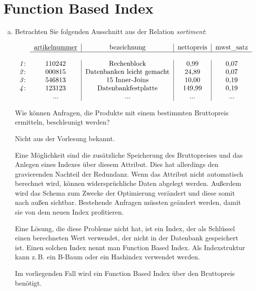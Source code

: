 \section{Function Based Index}
\begin{enumerate}[a)]
\item \label{item:fbi} Betrachten Sie folgenden Ausschnitt aus der Relation \textit{sortiment}:

\begin{center}
$\begin{tabular}{cc|c|c|c}
~&\underline{artikelnummer} & bezeichnung & nettopreis & mwst\_satz\\
\cline{2-5} \\
\textit{1}: & 110242 & Rechenblock & 0,99 & 0,07\\
\textit{2}: & 000815 & Datenbanken leicht gemacht & 24,89 & 0,07\\
\textit{3}: & 546813 & 15 Inner-Joins & 10,00 & 0,19\\
\textit{4}: & 123123 & Datenbankfestplatte & 149,99 & 0,19\\
~ & ... & ... & ... & ...
\end{tabular}$
\end{center}

Wie können Anfragen, die Produkte mit einem bestimmten Bruttopreis ermitteln, beschleunigt werden?

\begin{note}
Nicht aus der Vorlesung bekannt.
\end{note}

\begin{solution}
Eine Möglichkeit sind die zusätzliche Speicherung des Bruttopreises und das Anlegen eines Indexes über diesem Attribut.
Dies hat allerdings den gravierenden Nachteil der Redundanz.
Wenn das Attribut nicht automatisch berechnet wird, können widersprüchliche Daten abgelegt werden.
Außerdem wird das Schema zum Zwecke der Optimierung verändert und diese somit nach außen sichtbar.
Bestehende Anfragen müssten geändert werden, damit sie von dem neuen Index profitieren.

Eine Lösung, die diese Probleme nicht hat, ist ein Index, der als Schlüssel einen berechneten Wert verwendet, der nicht in der Datenbank gespeichert ist.
Einen solchen Index nennt man Function Based Index.
Als Indexstruktur kann z.\,B. ein B-Baum oder ein Hashindex verwendet werden.

Im vorliegenden Fall wird ein Function Based Index über den Bruttopreis benötigt.


\end{solution}
\end{enumerate}
